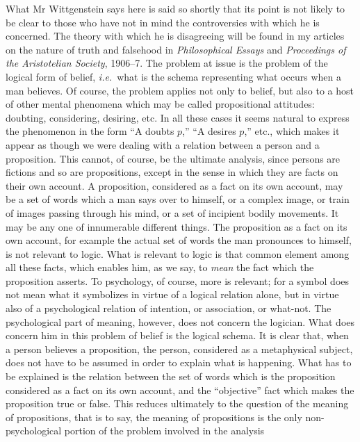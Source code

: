 \documentclass[12pt,oneside]{book}[2007/10/19]
\newcommand{\BookTitle}[1]{\emph{#1}}
\newcommand{\idEst}{\textit{i.e.}}
\begin{document}
What Mr Wittgenstein says here is said so shortly
that its point is not likely to be clear to those who have
not in mind the controversies with which he is concerned.
The theory with which he is disagreeing will be found
in my articles on the nature of truth and falsehood in
\BookTitle{Philosophical Essays} and \BookTitle{Proceedings of the Aristotelian
Society}, 1906--7. The problem at issue is the problem of
the logical form of belief, \idEst\ what is the schema representing
what occurs when a man believes. Of course, the
problem applies not only to belief, but also to a host of
other mental phenomena which may be called propositional
attitudes: doubting, considering, desiring, etc. In all
these cases it seems natural to express the phenomenon
in the form ``A doubts $p$,'' ``A desires $p$,'' etc., which
makes it appear as though we were dealing with a relation
between a person and a proposition. This cannot, of
course, be the ultimate analysis, since persons are fictions
and so are propositions, except in the sense in which they
are facts on their own account. A proposition, considered
as a fact on its own account, may be a set of words which
a man says over to himself, or a complex image, or train
of images passing through his mind, or a set of incipient
bodily movements. It may be any one of innumerable
different things. The proposition as a fact on its own
account, for example the actual set of words the man
pronounces to himself, is not relevant to logic. What is
relevant to logic is that common element among all these
facts, which enables him, as we say, to \emph{mean} the fact
which the proposition asserts. To psychology, of course,
more is relevant; for a symbol does not mean what it
symbolizes in virtue of a logical relation alone, but in
virtue also of a psychological relation of intention, or
association, or what-not. The psychological part of meaning,
however, does not concern the logician. What does
concern him in this problem of belief is the logical schema.
It is clear that, when a person believes a proposition, the
person, considered as a metaphysical subject, does not
have to be assumed in order to explain what is happening.
What has to be explained is the relation between the set
of words which is the proposition considered as a fact on
its own account, and the ``objective'' fact which makes
the proposition true or false. This reduces ultimately to
the question of the meaning of propositions, that is to
say, the meaning of propositions is the only non-psychological
portion of the problem involved in the analysis
\end{document}
